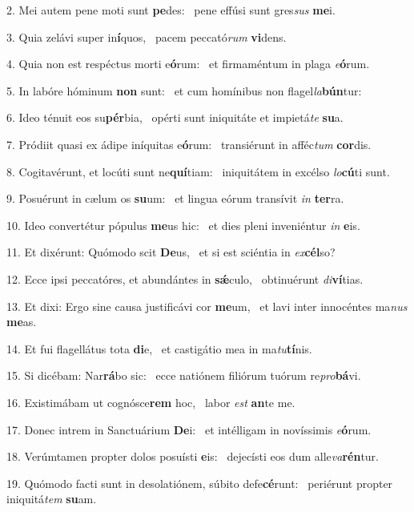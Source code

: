 2. Mei autem pene moti sunt \textbf{pe}des: \ast\  pene effúsi sunt gres\textit{sus} \textbf{me}i.\

3. Quia zelávi super in\textbf{í}quos, \ast\  pacem peccató\textit{rum} \textbf{vi}dens.\

4. Quia non est respéctus morti e\textbf{ó}rum: \ast\  et firmaméntum in plaga \textit{e}\textbf{ó}rum.\

5. In labóre hóminum \textbf{non} sunt: \ast\  et cum homínibus non flagel\textit{la}\textbf{bún}tur:\

6. Ideo ténuit eos su\textbf{pér}bia, \ast\  opérti sunt iniquitáte et impietá\textit{te} \textbf{su}a.\

7. Pródiit quasi ex ádipe iníquitas e\textbf{ó}rum: \ast\  transiérunt in afféc\textit{tum} \textbf{cor}dis.\

8. Cogitavérunt, et locúti sunt ne\textbf{quí}tiam: \ast\  iniquitátem in excélso \textit{lo}\textbf{cú}ti sunt.\

9. Posuérunt in cælum os \textbf{su}um: \ast\  et lingua eórum transívit \textit{in} \textbf{ter}ra.\

10. Ideo convertétur pópulus \textbf{me}us hic: \ast\  et dies pleni inveniéntur \textit{in} \textbf{e}is.\

11. Et dixérunt: Quómodo scit \textbf{De}us, \ast\  et si est sciéntia in \textit{ex}\textbf{cél}so?\

12. Ecce ipsi peccatóres, et abundántes in \textbf{sǽ}culo, \ast\  obtinuérunt \textit{di}\textbf{ví}tias.\

13. Et dixi: Ergo sine causa justificávi cor \textbf{me}um, \ast\  et lavi inter innocéntes ma\textit{nus} \textbf{me}as.\

14. Et fui flagellátus tota \textbf{di}e, \ast\  et castigátio mea in ma\textit{tu}\textbf{tí}nis.\

15. Si dicébam: Nar\textbf{rá}bo sic: \ast\  ecce natiónem filiórum tuórum re\textit{pro}\textbf{bá}vi.\

16. Existimábam ut cognósce\textbf{rem} hoc, \ast\  labor \textit{est} \textbf{an}te me.\

17. Donec intrem in Sanctuárium \textbf{De}i: \ast\  et intélligam in novíssimis \textit{e}\textbf{ó}rum.\

18. Verúmtamen propter dolos posuísti \textbf{e}is: \ast\  dejecísti eos dum alle\textit{va}\textbf{rén}tur.\

19. Quómodo facti sunt in desolatiónem, súbito defe\textbf{cé}runt: \ast\  periérunt propter iniquitá\textit{tem} \textbf{su}am.\

